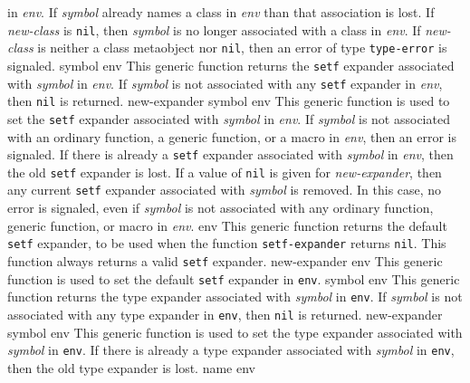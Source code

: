 in \textit{env}.  If \textit{symbol} already names a class
in \textit{env} than that association is lost.
\vskip -0.05cm
If \textit{new-class} is \texttt{nil}, then \textit{symbol} is no
longer associated with a class in \textit{env}.
\vskip -0.05cm
If \textit{new-class} is neither a class metaobject nor \texttt{nil},
then an error of type \texttt{type-error} is signaled.
\vskip -0.05cm
 {symbol env}
\vskip -0.2cm
This generic function returns the \texttt{setf} expander associated with
\textit{symbol} in \textit{env}.  If \textit{symbol} is not associated
with any \texttt{setf} expander in \textit{env}, then \texttt{nil} is returned.
\vskip -0.05cm
 {new-expander symbol env}
\vskip -0.2cm
This generic function is used to set the \texttt{setf} expander associated
with \textit{symbol} in \textit{env}.
\vskip -0.05cm
If \textit{symbol} is not associated with an ordinary function, a generic
function, or a macro in \textit{env}, then an error is signaled.
\vskip -0.05cm
If there is already a \texttt{setf} expander associated with \textit{symbol} in
\textit{env}, then the old \texttt{setf} expander is lost.
\vskip -0.05cm
If a value of \texttt{nil} is given for \textit{new-expander}, then
any current \texttt{setf} expander associated with \textit{symbol} is removed.
In this case, no error is signaled, even if \textit{symbol} is not
associated with any ordinary function, generic function, or macro
in \textit{env}.
\vskip -0.05cm
 {env}
\vskip -0.2cm
This generic function returns the default \texttt{setf} expander, to
be used when the function \texttt{setf-expander} returns \texttt{nil}.
This function always returns a valid \texttt{setf} expander.
\vskip -0.05cm
 {new-expander env}
\vskip -0.2cm
This generic function is used to set the default \texttt{setf}
expander in \texttt{env}.
\vskip -0.05cm
 {symbol env}
\vskip -0.2cm
This generic function returns the type expander associated with
\textit{symbol} in \texttt{env}.  If \textit{symbol} is not associated
with any type expander in \texttt{env}, then \texttt{nil} is returned.
\vskip -0.05cm
 {new-expander symbol env}
\vskip -0.2cm
This generic function is used to set the type expander associated
with \textit{symbol} in \texttt{env}.
\vskip -0.05cm
If there is already a type expander associated with \textit{symbol} in
\texttt{env}, then the old type expander is lost.
\vskip -0.05cm
 {name env}
